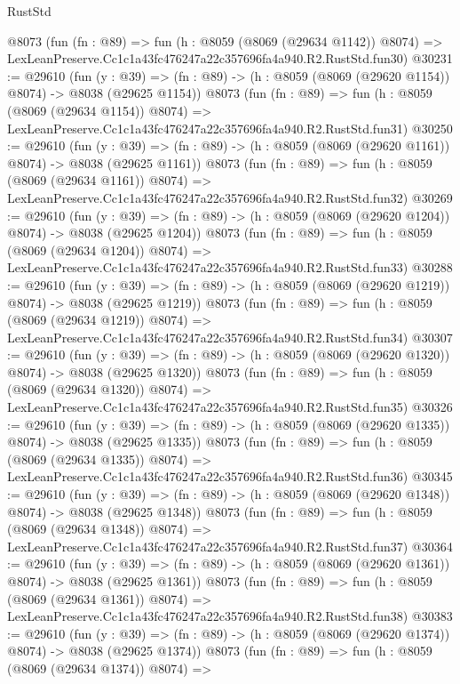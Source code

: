 \begin{lexlean}{RustStd}
\begin{coremodule}
    @8073
    (fun (fn : @89) =>
    fun (h : @8059 (@8069 (@29634 @1142)) @8074) =>
    LexLeanPreserve.Cc1c1a43fc476247a22c357696fa4a940.R2.RustStd.fun30)
@30231 := @29610
    (fun (y : @39) =>
    (fn : @89) -> (h : @8059 (@8069 (@29620 @1154)) @8074) -> @8038 (@29625 @1154))
    @8073
    (fun (fn : @89) =>
    fun (h : @8059 (@8069 (@29634 @1154)) @8074) =>
    LexLeanPreserve.Cc1c1a43fc476247a22c357696fa4a940.R2.RustStd.fun31)
@30250 := @29610
    (fun (y : @39) =>
    (fn : @89) -> (h : @8059 (@8069 (@29620 @1161)) @8074) -> @8038 (@29625 @1161))
    @8073
    (fun (fn : @89) =>
    fun (h : @8059 (@8069 (@29634 @1161)) @8074) =>
    LexLeanPreserve.Cc1c1a43fc476247a22c357696fa4a940.R2.RustStd.fun32)
@30269 := @29610
    (fun (y : @39) =>
    (fn : @89) -> (h : @8059 (@8069 (@29620 @1204)) @8074) -> @8038 (@29625 @1204))
    @8073
    (fun (fn : @89) =>
    fun (h : @8059 (@8069 (@29634 @1204)) @8074) =>
    LexLeanPreserve.Cc1c1a43fc476247a22c357696fa4a940.R2.RustStd.fun33)
@30288 := @29610
    (fun (y : @39) =>
    (fn : @89) -> (h : @8059 (@8069 (@29620 @1219)) @8074) -> @8038 (@29625 @1219))
    @8073
    (fun (fn : @89) =>
    fun (h : @8059 (@8069 (@29634 @1219)) @8074) =>
    LexLeanPreserve.Cc1c1a43fc476247a22c357696fa4a940.R2.RustStd.fun34)
@30307 := @29610
    (fun (y : @39) =>
    (fn : @89) -> (h : @8059 (@8069 (@29620 @1320)) @8074) -> @8038 (@29625 @1320))
    @8073
    (fun (fn : @89) =>
    fun (h : @8059 (@8069 (@29634 @1320)) @8074) =>
    LexLeanPreserve.Cc1c1a43fc476247a22c357696fa4a940.R2.RustStd.fun35)
@30326 := @29610
    (fun (y : @39) =>
    (fn : @89) -> (h : @8059 (@8069 (@29620 @1335)) @8074) -> @8038 (@29625 @1335))
    @8073
    (fun (fn : @89) =>
    fun (h : @8059 (@8069 (@29634 @1335)) @8074) =>
    LexLeanPreserve.Cc1c1a43fc476247a22c357696fa4a940.R2.RustStd.fun36)
@30345 := @29610
    (fun (y : @39) =>
    (fn : @89) -> (h : @8059 (@8069 (@29620 @1348)) @8074) -> @8038 (@29625 @1348))
    @8073
    (fun (fn : @89) =>
    fun (h : @8059 (@8069 (@29634 @1348)) @8074) =>
    LexLeanPreserve.Cc1c1a43fc476247a22c357696fa4a940.R2.RustStd.fun37)
@30364 := @29610
    (fun (y : @39) =>
    (fn : @89) -> (h : @8059 (@8069 (@29620 @1361)) @8074) -> @8038 (@29625 @1361))
    @8073
    (fun (fn : @89) =>
    fun (h : @8059 (@8069 (@29634 @1361)) @8074) =>
    LexLeanPreserve.Cc1c1a43fc476247a22c357696fa4a940.R2.RustStd.fun38)
@30383 := @29610
    (fun (y : @39) =>
    (fn : @89) -> (h : @8059 (@8069 (@29620 @1374)) @8074) -> @8038 (@29625 @1374))
    @8073
    (fun (fn : @89) =>
    fun (h : @8059 (@8069 (@29634 @1374)) @8074) =>

\end{coremodule}
\end{lexlean}
